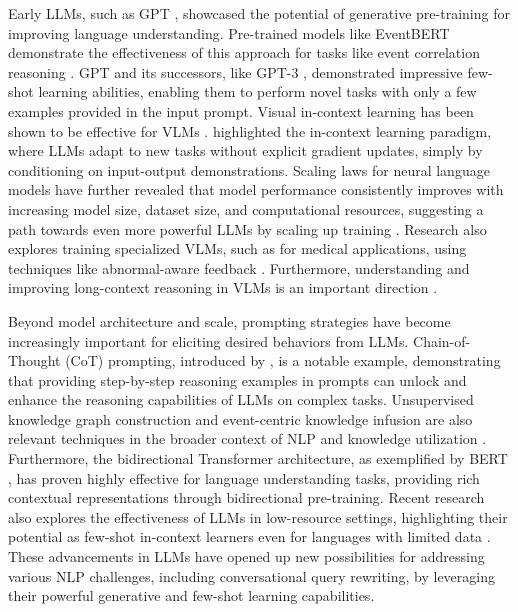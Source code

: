 Early LLMs, such as GPT \cite{GPT2018}, showcased the potential of generative pre-training for improving language understanding.  Pre-trained models like EventBERT demonstrate the effectiveness of this approach for tasks like event correlation reasoning \cite{zhou2022eventbert}. GPT and its successors, like GPT-3 \cite{GPT3FewShot2020}, demonstrated impressive few-shot learning abilities, enabling them to perform novel tasks with only a few examples provided in the input prompt.  Visual in-context learning has been shown to be effective for VLMs \cite{zhou2024visual}.  \cite{GPT3FewShot2020} highlighted the in-context learning paradigm, where LLMs adapt to new tasks without explicit gradient updates, simply by conditioning on input-output demonstrations.  Scaling laws for neural language models have further revealed that model performance consistently improves with increasing model size, dataset size, and computational resources, suggesting a path towards even more powerful LLMs by scaling up training \cite{ScalingLawsNLM2020}.  Research also explores training specialized VLMs, such as for medical applications, using techniques like abnormal-aware feedback \cite{zhou2025training}. Furthermore, understanding and improving long-context reasoning in VLMs is an important direction \cite{zhou2024rethinking}.

Beyond model architecture and scale, prompting strategies have become increasingly important for eliciting desired behaviors from LLMs. Chain-of-Thought (CoT) prompting, introduced by \cite{CoTPrompting2022}, is a notable example, demonstrating that providing step-by-step reasoning examples in prompts can unlock and enhance the reasoning capabilities of LLMs on complex tasks.  Unsupervised knowledge graph construction and event-centric knowledge infusion are also relevant techniques in the broader context of NLP and knowledge utilization \cite{wang2022unsupervised}. Furthermore, the bidirectional Transformer architecture, as exemplified by BERT \cite{BERT2019}, has proven highly effective for language understanding tasks, providing rich contextual representations through bidirectional pre-training. Recent research also explores the effectiveness of LLMs in low-resource settings, highlighting their potential as few-shot in-context learners even for languages with limited data \cite{LLMsFewShotLearners2024}. These advancements in LLMs have opened up new possibilities for addressing various NLP challenges, including conversational query rewriting, by leveraging their powerful generative and few-shot learning capabilities.


